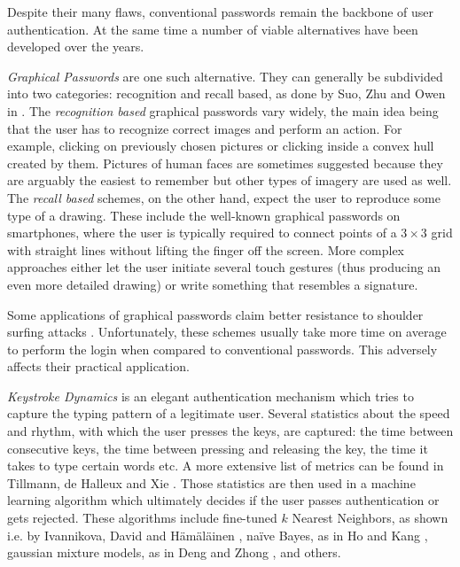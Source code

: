 Despite their many flaws, conventional passwords remain the backbone of user authentication. At the same time a number of viable alternatives have been developed over the years.

\emph{Graphical Passwords} are one such alternative. They can generally be subdivided into two categories: recognition and recall based, as done by Suo, Zhu and Owen in \cite{suo:2005:graphical-passwords-survey}. The \emph{recognition based} graphical passwords vary widely, the main idea being that the user has to recognize correct images and perform an action. For example, clicking on previously chosen pictures or clicking inside a convex hull created by them. Pictures of human faces are sometimes suggested because they are arguably the easiest to remember but other types of imagery are used as well. The \emph{recall based} schemes, on the other hand, expect the user to reproduce some type of a drawing. These include the well-known graphical passwords on smartphones, where the user is typically required to connect points of a \(3 \times 3\) grid with straight lines without lifting the finger off the screen. More complex approaches either let the user initiate several touch gestures (thus producing an even more detailed drawing) or write something that resembles a signature.

Some applications of graphical passwords claim better resistance to shoulder surfing attacks \cite{suo:2005:graphical-passwords-survey}. Unfortunately, these schemes usually take more time on average to perform the login when compared to conventional passwords. This adversely affects their practical application.

\emph{Keystroke Dynamics} is an elegant authentication mechanism which tries to capture the typing pattern of a legitimate user. Several statistics about the speed and rhythm, with which the user presses the keys, are captured: the time between consecutive keys, the time between pressing and releasing the key, the time it takes to type certain words etc. A more extensive list of metrics can be found in  Tillmann, de Halleux and Xie \cite{teh:2013:survey-keystroke-biometrics}. Those statistics are then used in a machine learning algorithm which ultimately decides if the user passes authentication or gets rejected. These algorithms include fine-tuned \(k\) Nearest Neighbors, as shown i.e. by Ivannikova, David and Hämäläinen \cite{ivannikova:2017:anomaly-detection-keystroke-dynamics}, naïve Bayes, as in Ho and Kang \cite{ho:2017:onenb}, gaussian mixture models, as in Deng and Zhong \cite{yunbin:2013:gmm-keystroke}, and others.

